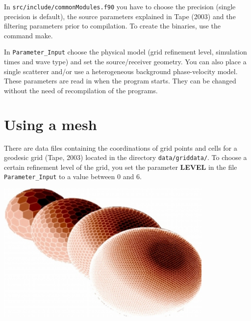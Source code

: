 \documentclass[a4paper,
                          headsepline,
                          listof=totoc,
                          toc=listof,
                          headings=small]{scrreprt} %
\begin{document}
In \texttt{src/include/commonModules.f90} you have to choose the precision (single
precision is default), the source parameters explained in {Tape} (2003)
and the filtering parameters prior to compilation. To create the binaries, use
the command \textsf{make}.


In \texttt{Parameter\_Input} choose the physical model (grid refinement level,
simulation times and wave type) and set the source/receiver geometry. You can also place
a single scatterer and/or use a heterogeneous background phase-velocity model. These
parameters are read in when the program starts. They can be changed without
the need of recompilation of the programs.




\chapter{Using a mesh}
There are data files containing the coordinations of grid points and cells for a geodesic grid
({Tape}, 2003) located in the directory \texttt{data/griddata/}. To choose a certain refinement level
of the grid, you set the parameter \textbf{LEVEL} in the file \texttt{Parameter\_Input}
to a value between $0$ and $6$.

\vspace{2cm}
\begin{center}
\includegraphics[width=0.8\textwidth]{figures/spheres.jpg}
\end{center}
\end{document}

